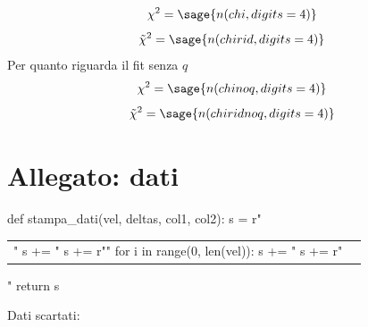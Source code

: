 $$\chi^2 = \sage{n(chi, digits=4)}$$
$$\tilde{\chi}^2 = \sage{n(chirid, digits=4)}$$
Per quanto riguarda il fit senza $q$
$$\chi^2 = \sage{n(chinoq, digits=4)}$$
$$\tilde{\chi}^2 = \sage{n(chiridnoq, digits=4)}$$

\section{Allegato: dati}
\begin{sagesilent}
def stampa_dati(vel, deltas, col1, col2):
  s = r"\begin{tabular}{c|c}"
  s += "%
  s += r"\midrule"
  for i in range(0, len(vel)):
    s += "%
  s += r"\end{tabular}"
  return s
\end{sagesilent}

\begin{center}
\end{center}
Dati scartati:
\begin{center}
\end{center}
